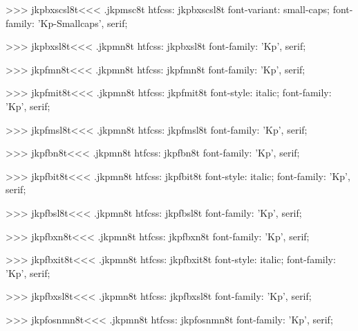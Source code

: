 >>>
\<jkpbxscsl8t\><<<
.jkpmsc8t
htfcss:  jkpbxscsl8t  font-variant: small-caps; font-family: 'Kp-Smallcaps', serif;

>>>
\<jkpbxsl8t\><<<
.jkpmn8t
htfcss:  jkpbxsl8t  font-family: 'Kp', serif;

>>>
\<jkpfmn8t\><<<
.jkpmn8t
htfcss:  jkpfmn8t  font-family: 'Kp', serif;

>>>
\<jkpfmit8t\><<<
.jkpmn8t
htfcss:  jkpfmit8t  font-style: italic; font-family: 'Kp', serif;

>>>
\<jkpfmsl8t\><<<
.jkpmn8t
htfcss:  jkpfmsl8t  font-family: 'Kp', serif;

>>>
\<jkpfbn8t\><<<
.jkpmn8t
htfcss:  jkpfbn8t  font-family: 'Kp', serif;

>>>
\<jkpfbit8t\><<<
.jkpmn8t
htfcss:  jkpfbit8t  font-style: italic; font-family: 'Kp', serif;

>>>
\<jkpfbsl8t\><<<
.jkpmn8t
htfcss:  jkpfbsl8t  font-family: 'Kp', serif;

>>>
\<jkpfbxn8t\><<<
.jkpmn8t
htfcss:  jkpfbxn8t  font-family: 'Kp', serif;

>>>
\<jkpfbxit8t\><<<
.jkpmn8t
htfcss:  jkpfbxit8t  font-style: italic; font-family: 'Kp', serif;

>>>
\<jkpfbxsl8t\><<<
.jkpmn8t
htfcss:  jkpfbxsl8t  font-family: 'Kp', serif;

>>>
\<jkpfosnmn8t\><<<
.jkpmn8t
htfcss:  jkpfosnmn8t  font-family: 'Kp', serif;

